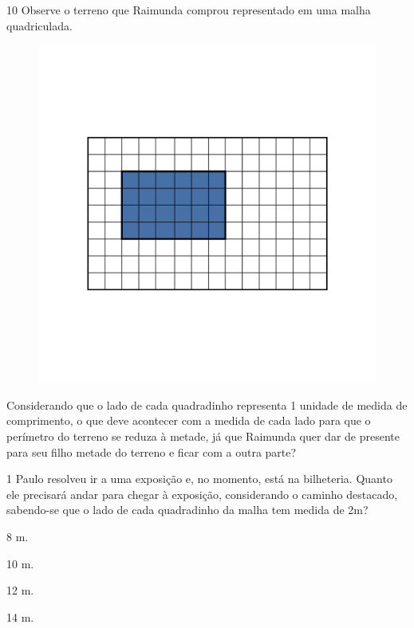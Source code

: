 \num{10} Observe o terreno que Raimunda comprou representado em uma malha
quadriculada.

\begin{figure}[htpb!]
\includegraphics[width=\textwidth]{../ilustracoes/MAT5/SAEB_5ANO_MAT_figura45.png}
\end{figure}

Considerando que o lado de cada quadradinho representa 1 unidade de
medida de comprimento, o que deve acontecer com a medida de cada lado
para que o perímetro do terreno se reduza à metade, já que Raimunda quer
dar de presente para seu filho metade do terreno e ficar com a outra
parte?



\num{1} Paulo resolveu ir a uma exposição e, no momento, está na bilheteria. Quanto ele precisará andar para chegar à exposição,
considerando o caminho destacado, sabendo-se que o lado de cada quadradinho da malha tem medida de 2m?


\begin{escolha}
\item
  8 m.
\item
  10 m.
\item
  12 m.
\item
  14 m.
\end{escolha}

